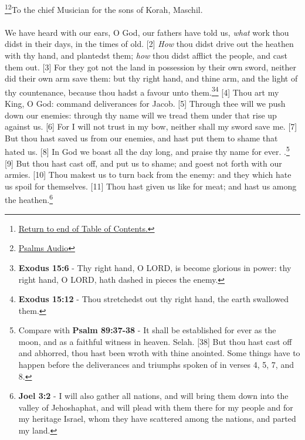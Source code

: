 \footnote{\textcolor[cmyk]{0.99998,1,0,0}{\hyperlink{TOC}{Return to end of Table of Contents.}}}\footnote{\href{https://audiobible.com/bible}{\textcolor[cmyk]{0.99998,1,0,0}{Psalms Audio}}}\textcolor[cmyk]{0.99998,1,0,0}{To the chief Musician for the sons of Korah, Maschil.}\\
\\
\textcolor[cmyk]{0.99998,1,0,0}{We have heard with our ears, O God, our fathers have told us, \emph{what} work thou didst in their days, in the times of old.}
[2] \textcolor[cmyk]{0.99998,1,0,0}{\emph{How} thou didst drive out the heathen with thy hand, and plantedst them; \emph{how} thou didst afflict the people, and cast them out.}%
[3] \textcolor[cmyk]{0.99998,1,0,0}{For they got not the land in possession by their own sword, neither did their own arm save them: but thy right hand, and thine arm, and the light of thy countenance, because thou hadst a favour unto them.}\footnote{\textbf{Exodus 15:6} - Thy right hand, O LORD, is become glorious in power: thy right hand, O LORD, hath dashed in pieces the enemy.}\footnote{\textbf{Exodus 15:12} -  Thou stretchedst out thy right hand, the earth swallowed them.}%
[4] \textcolor[cmyk]{0.99998,1,0,0}{Thou art my King, O God: command deliverances for Jacob.}
[5] \textcolor[cmyk]{0.99998,1,0,0}{Through thee will we push down our enemies: through thy name will we tread them under that rise up against us.}
[6] \textcolor[cmyk]{0.99998,1,0,0}{For I will not trust in my bow, neither shall my sword save me.}
[7] \textcolor[cmyk]{0.99998,1,0,0}{But thou hast saved us from our enemies, and hast put them to shame that hated us.}
[8] \textcolor[cmyk]{0.99998,1,0,0}{In God we boast all the day long, and praise thy name for ever. .}\footnote{Compare with \textbf{Psalm 89:37-38} - It shall be established for ever as the moon, and as a faithful witness in heaven. Selah. [38] But thou hast cast off and abhorred, thou hast been wroth with thine anointed. Some things have to happen before the deliverances and triumphs spoken of in verses 4, 5, 7, and 8.} 
[9] \textcolor[cmyk]{0.99998,1,0,0}{But thou hast cast off, and put us to shame; and goest not forth with our armies.}
[10] \textcolor[cmyk]{0.99998,1,0,0}{Thou makest us to turn back from the enemy: and they which hate us spoil for themselves.}
[11] \textcolor[cmyk]{0.99998,1,0,0}{Thou hast given us like  for meat; and hast  us among the heathen.}\footnote{\textbf{Joel 3:2} -  I will also gather all nations, and will bring them down into the valley of Jehoshaphat, and will plead with them there for my people and for my heritage Israel, whom they have scattered among the nations, and parted my land.}

